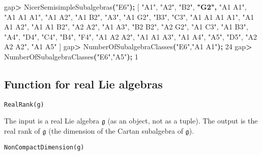 \documentclass[
]{article}
\newenvironment{Shaded}{\begin{snugshade}}{\end{snugshade}}
\newcommand{\BuiltInTok}[1]{#1}
\newcommand{\ErrorTok}[1]{\textcolor[rgb]{0.64,0.00,0.00}{\textbf{#1}}}
\newcommand{\ExtensionTok}[1]{#1}
\newcommand{\KeywordTok}[1]{\textcolor[rgb]{0.13,0.29,0.53}{\textbf{#1}}}
\newcommand{\NormalTok}[1]{#1}
\newcommand{\OperatorTok}[1]{\textcolor[rgb]{0.81,0.36,0.00}{\textbf{#1}}}
\newcommand{\StringTok}[1]{\textcolor[rgb]{0.31,0.60,0.02}{#1}}
\begin{document}
\begin{Shaded}
\begin{Highlighting}[]
\ExtensionTok{gap}\OperatorTok{\textgreater{}}\NormalTok{ NicerSemisimpleSubalgebras}\ErrorTok{(}\StringTok{"E6"}\KeywordTok{);}
\BuiltInTok{[} \StringTok{"A1"}\NormalTok{, }\StringTok{"A2"}\NormalTok{, }\StringTok{"B2"}\NormalTok{, }\ErrorTok{"G2",} \StringTok{"A1 A1"}\NormalTok{, }\StringTok{"A1 A1 A1"}\NormalTok{, }\StringTok{"A1 A2"}\NormalTok{, }\StringTok{"A1 B2"}\NormalTok{, }\StringTok{"A3"}\NormalTok{, }\StringTok{"A1 G2"}\NormalTok{, }\StringTok{"B3"}\NormalTok{, }
\StringTok{"C3"}\ExtensionTok{,} \StringTok{"A1 A1 A1 A1"}\NormalTok{, }\StringTok{"A1 A1 A2"}\NormalTok{, }\StringTok{"A1 A1 B2"}\NormalTok{, }\StringTok{"A2 A2"}\NormalTok{, }\StringTok{"A1 A3"}\NormalTok{, }\StringTok{"B2 B2"}\NormalTok{, }\StringTok{"A2 G2"}\NormalTok{, }\StringTok{"A1 C3"}\NormalTok{,}
\StringTok{"A1 B3"}\ExtensionTok{,} \StringTok{"A4"}\NormalTok{, }\StringTok{"D4"}\NormalTok{, }\StringTok{"C4"}\NormalTok{, }\StringTok{"B4"}\NormalTok{, }\StringTok{"F4"}\NormalTok{, }\StringTok{"A1 A2 A2"}\NormalTok{, }\StringTok{"A1 A1 A3"}\NormalTok{,  }\StringTok{"A1 A4"}\NormalTok{, }\StringTok{"A5"}\NormalTok{, }\StringTok{"D5"}\NormalTok{, }
\StringTok{"A2 A2 A2"}\ExtensionTok{,} \StringTok{"A1 A5"}\NormalTok{ ]}
\ExtensionTok{gap}\OperatorTok{\textgreater{}}\NormalTok{ NumberOfSubalgebraClasses}\ErrorTok{(}\StringTok{"E6"}\ExtensionTok{,}\StringTok{"A1 A1"}\KeywordTok{);}
\ExtensionTok{24}
\ExtensionTok{gap}\OperatorTok{\textgreater{}}\NormalTok{ NumberOfSubalgebraClasses}\ErrorTok{(}\StringTok{"E6"}\ExtensionTok{,}\StringTok{"A5"}\KeywordTok{);}
\ExtensionTok{1}
\end{Highlighting}
\end{Shaded}

\hypertarget{function-for-real-lie-algebras}{%
\subsection{Function for real Lie
algebras}\label{function-for-real-lie-algebras}}

\begin{verbatim}
RealRank(g)
\end{verbatim}

The input is a real Lie algebra \(\mathfrak{g}\) (as an object, not as a
tuple). The output is the real rank of \(\mathfrak{g}\) (the dimension
of the Cartan subalgebra of \(\mathfrak{g}\)).

\begin{verbatim}
NonCompactDimension(g)
\end{verbatim}
\end{document}

